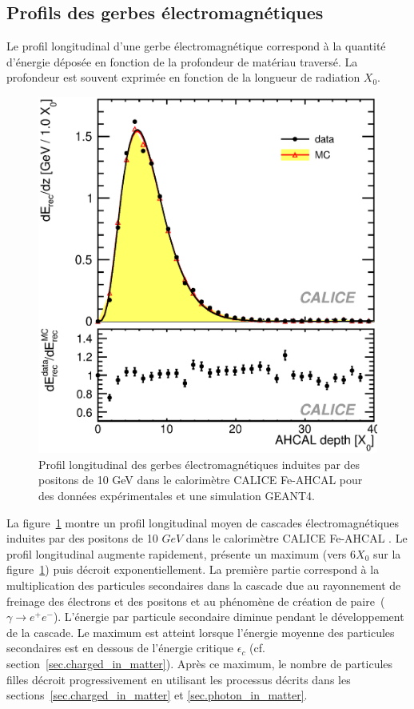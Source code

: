 \subsection{Profils des gerbes électromagnétiques}
Le profil longitudinal d'une gerbe électromagnétique correspond à la quantité d'énergie déposée en fonction de la profondeur de matériau traversé. La profondeur est souvent exprimée en fonction de la longueur de radiation $X_0$.
\begin{figure}[!h]
  \begin{center}
    \includegraphics[width=.5\textwidth]{ShowerTh/figs/lProfile.eps}
    \caption{Profil longitudinal des gerbes électromagnétiques induites par des positons de 10 GeV dans le calorimètre CALICE Fe-AHCAL pour des données expérimentales et une simulation GEANT4.}
    \label{fig:lProfil_e-}
  \end{center}
\end{figure}
La figure~\ref{fig:lProfil_e-} montre un profil longitudinal moyen de cascades électromagnétiques induites par des positons de 10 $GeV$ dans le calorimètre CALICE Fe-AHCAL \cite{1748-0221-6-04-P04003}. Le profil longitudinal augmente rapidement, présente un maximum (vers $6X_0$ sur la figure~\ref{fig:lProfil_e-}) puis décroit exponentiellement. La première partie correspond à la multiplication des particules secondaires dans la cascade due au rayonnement de freinage des électrons et des positons et au phénomène de création de paire~($\gamma\rightarrow e^+e^-$). L'énergie par particule secondaire diminue pendant le développement de la cascade. Le maximum est atteint lorsque l'énergie moyenne des particules secondaires est en dessous de l'énergie critique $\epsilon_c$ (cf. section~\ref{sec.charged_in_matter}). Après ce maximum, le nombre de particules filles décroit progressivement en utilisant les processus décrits dans les sections~\ref{sec.charged_in_matter} et \ref{sec.photon_in_matter}.

